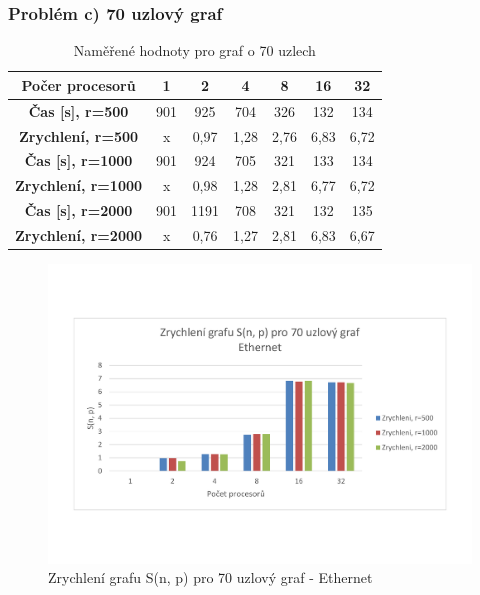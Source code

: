 \documentclass[11pt]{article}
\begin{document}
\newpage
\subsubsection{Problém c) 70 uzlový graf}
\begin{table}[h]
	\caption{Naměřené hodnoty pro graf o 70 uzlech}
	\label{tab:namereneHodnotyGraf70}
	\centering
	\begin{tabular}{| c || c | c | c | c | c | c |}
		\hline
		\textbf{Počer procesorů} & \textbf{1} & \textbf{2} & \textbf{4} & \textbf{8} & \textbf{16} & \textbf{32} \\
		\hline \hline
		\textbf{Čas [s], r=500} & 901 & 925 & 704 & 326 & 132 & 134 \\
		\hline
		\textbf{Zrychlení, r=500} & x & 0,97 & 1,28 & 2,76 & 6,83 & 6,72  \\
		\hline
		\textbf{Čas [s], r=1000} & 901 & 924 & 705 & 321 & 133 & 134 \\
		\hline
		\textbf{Zrychlení, r=1000} & x & 0,98 & 1,28 & 2,81 & 6,77 & 6,72 \\
		\hline
		\textbf{Čas [s], r=2000} & 901 & 1191 & 708 & 321 & 132 & 135 \\
		\hline
		\textbf{Zrychlení, r=2000} & x & 0,76 & 1,27 & 2,81 & 6,83 & 6,67 \\
		\hline
	\end{tabular}
\end{table}

\begin{figure}[h]
  \centering
 	\caption{Zrychlení grafu S(n, p) pro 70 uzlový graf - Ethernet}
  	\includegraphics[width=15cm]{zrychleni70.pdf}
\end{figure}
\end{document}
